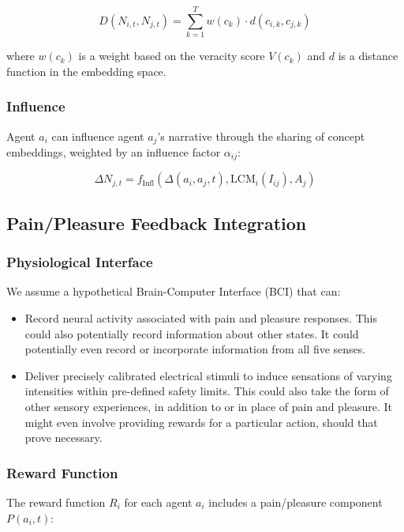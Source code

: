 \documentclass[12pt, a4paper]{article}
\begin{document}
\begin{equation}
D(N_{i,t}, N_{j,t}) = \sum_{k=1}^T w(c_k) \cdot d(c_{i,k}, c_{j,k})
\end{equation}

where $w(c_k)$ is a weight based on the veracity score $V(c_k)$ and $d$ is a distance function in the embedding space.



\subsubsection{Influence}
Agent $a_i$ can influence agent $a_j$'s narrative through the sharing of concept embeddings, weighted by an influence factor $\alpha_{ij}$:

\begin{equation}
\Delta N_{j,t} = f_{\text{Infl}}(\Delta(a_i, a_j, t), \text{LCM}_i(I_{ij}), A_j)
\end{equation}


 

\subsection{Pain/Pleasure Feedback Integration}

\subsubsection{Physiological Interface}
We assume a hypothetical Brain-Computer Interface (BCI) that can:
\begin{itemize}
    \item Record neural activity associated with pain and pleasure responses. This could also potentially record information about other states. It could potentially even record or incorporate information from all five senses.
    \item Deliver precisely calibrated electrical stimuli to induce sensations of varying intensities within pre-defined safety limits. This could also take the form of other sensory experiences, in addition to or in place of pain and pleasure. It might even involve providing rewards for a particular action, should that prove necessary.
\end{itemize}

\subsubsection{Reward Function}
The reward function $R_i$ for each agent $a_i$ includes a pain/pleasure component $P(a_i, t)$:
\end{document}
